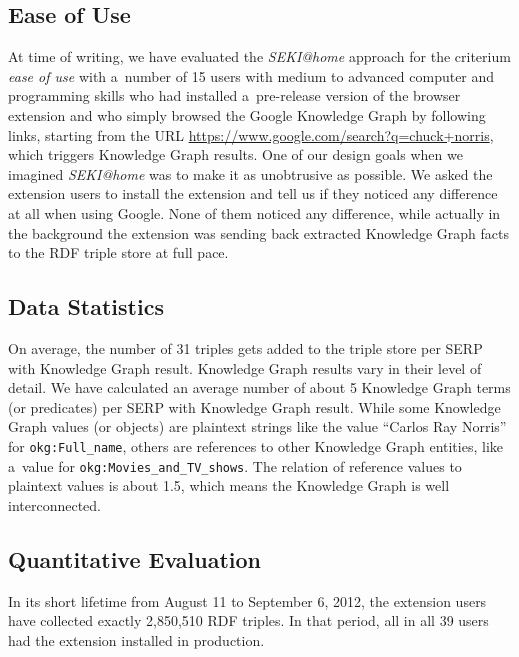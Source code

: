 \documentclass[runningheads,a4paper]{llncs}
\begin{document}
\subsection{Ease of Use}
At time of writing, we have evaluated the \emph{SEKI@home} approach
for the criterium \emph{ease of use} with a~number of 15 users
with medium to advanced computer and programming skills
who had installed a~pre-release version of the browser extension
and who simply browsed the Google Knowledge Graph by following links,
starting from the URL \url{https://www.google.com/search?q=chuck+norris},
which triggers Knowledge Graph results.
One of our design goals when we imagined \emph{SEKI@home}
was to make it as unobtrusive as possible.
We asked the extension users to install the extension
and tell us if they noticed any difference at all when using Google.
None of them noticed any difference,
while actually in the background the extension
was sending back extracted Knowledge Graph facts
to the RDF triple store at full pace.

\subsection{Data Statistics}
On average, the number of 31 triples gets added to the triple store
per SERP with Knowledge Graph result.
Knowledge Graph results vary in their level of detail.
We have calculated an average number of about 5
Knowledge Graph terms (or predicates) per SERP with Knowledge Graph result.
While some Knowledge Graph values (or objects) are plaintext strings
like the value ``Carlos Ray Norris'' for \texttt{okg:Full\_name},
others are references to other Knowledge Graph entities,
like a~value for \texttt{okg:Movies\_and\_TV\_shows}.
The relation of reference values to plaintext values is about 1.5,
which means the Knowledge Graph is well interconnected.

\subsection{Quantitative Evaluation}
In its short lifetime from August 11 to September 6, 2012, the extension users
have collected exactly 2,850,510 RDF triples.
In that period, all in all 39 users had the extension installed in production.
\end{document}
